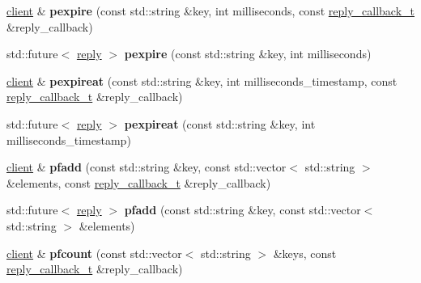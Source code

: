 \begin{DoxyCompactItemize}
\mbox{\hyperlink{classcpp__redis_1_1client}{client}} \& {\bfseries pexpire} (const std\+::string \&key, int milliseconds, const \mbox{\hyperlink{classcpp__redis_1_1client_af7a65eb21aa25230bfbb0b0203c4fc04}{reply\+\_\+callback\+\_\+t}} \&reply\+\_\+callback)
\item 
\mbox{\label{classcpp__redis_1_1client_aa0974d486cae342eced35d64c6e68d40}} 
std\+::future$<$ \mbox{\hyperlink{classcpp__redis_1_1reply}{reply}} $>$ {\bfseries pexpire} (const std\+::string \&key, int milliseconds)
\item 
\mbox{\label{classcpp__redis_1_1client_a7c872e32ed28a78515c1711e4cafbabf}} 
\mbox{\hyperlink{classcpp__redis_1_1client}{client}} \& {\bfseries pexpireat} (const std\+::string \&key, int milliseconds\+\_\+timestamp, const \mbox{\hyperlink{classcpp__redis_1_1client_af7a65eb21aa25230bfbb0b0203c4fc04}{reply\+\_\+callback\+\_\+t}} \&reply\+\_\+callback)
\item 
\mbox{\label{classcpp__redis_1_1client_af7aeaf2681d57fc30c8535c8d5df1e72}} 
std\+::future$<$ \mbox{\hyperlink{classcpp__redis_1_1reply}{reply}} $>$ {\bfseries pexpireat} (const std\+::string \&key, int milliseconds\+\_\+timestamp)
\item 
\mbox{\label{classcpp__redis_1_1client_ade84308f3ef8bfc75c092388ec538469}} 
\mbox{\hyperlink{classcpp__redis_1_1client}{client}} \& {\bfseries pfadd} (const std\+::string \&key, const std\+::vector$<$ std\+::string $>$ \&elements, const \mbox{\hyperlink{classcpp__redis_1_1client_af7a65eb21aa25230bfbb0b0203c4fc04}{reply\+\_\+callback\+\_\+t}} \&reply\+\_\+callback)
\item 
\mbox{\label{classcpp__redis_1_1client_ac6534e0aaf0ef3c87e312b12fd1a5a97}} 
std\+::future$<$ \mbox{\hyperlink{classcpp__redis_1_1reply}{reply}} $>$ {\bfseries pfadd} (const std\+::string \&key, const std\+::vector$<$ std\+::string $>$ \&elements)
\item 
\mbox{\label{classcpp__redis_1_1client_acf88e97aac689b64af0e73843811d837}} 
\mbox{\hyperlink{classcpp__redis_1_1client}{client}} \& {\bfseries pfcount} (const std\+::vector$<$ std\+::string $>$ \&keys, const \mbox{\hyperlink{classcpp__redis_1_1client_af7a65eb21aa25230bfbb0b0203c4fc04}{reply\+\_\+callback\+\_\+t}} \&reply\+\_\+callback)

\end{DoxyCompactItemize}
